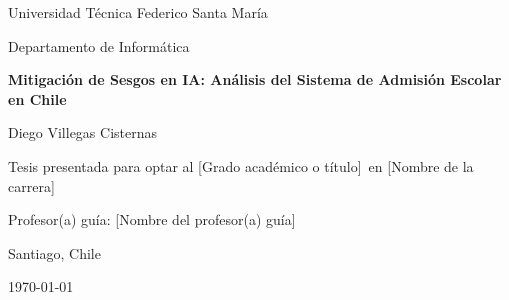 \documentclass[12pt,a4paper]{report}
\title{\tituloTesis}
\author{Diego Villegas Cisternas}
\date{\fechaTesis}
\newcommand{\tituloTesis}{Mitigación de Sesgos en IA: Análisis del Sistema de Admisión Escolar en Chile}
\newcommand{\autorTesis}{Diego Villegas Cisternas}
\newcommand{\institucionTesis}{Universidad Técnica Federico Santa María}
\newcommand{\facultadTesis}{Departamento de Informática}
\newcommand{\carreraTesis}{[Nombre de la carrera]}       %
\newcommand{\gradoTesis}{[Grado académico o título]}     %
\newcommand{\directorTesis}{[Nombre del profesor(a) guía]} %
\newcommand{\fechaTesis}{\today}
\newcommand{\ciudadTesis}{Santiago, Chile}
\begin{document}
\begingroup
\hypersetup{pageanchor=false}

\begin{titlepage}
    \centering
    \vspace*{1cm}

    {\large \institucionTesis \par}
    {\large \facultadTesis \par}

    \vspace{2.5cm}

    {\Huge \bfseries \tituloTesis \par}

    \vspace{2.5cm}

    {\large \autorTesis \par}

    \vspace{1.5cm}

    {\normalsize Tesis presentada para optar al \gradoTesis \ en \carreraTesis \par}

    \vspace{1.5cm}

    {\normalsize Profesor(a) guía: \directorTesis \par}

    \vfill

    {\large \ciudadTesis \par}
    {\large \fechaTesis \par}
\end{titlepage}

\tableofcontents
\clearpage

\endgroup
{}










\end{document}
